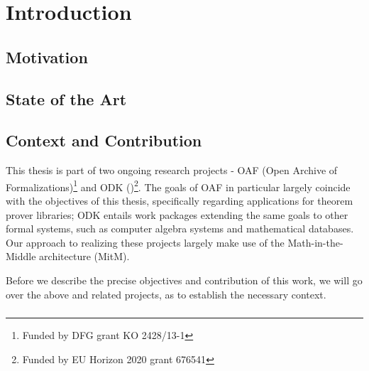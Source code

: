 \documentclass[a4paper,11pt]{book}
\begin{document}
\part{Introduction}

\chapter{Motivation}\label{ch:intro}


\chapter{State of the Art}\label{sec:intro:sota}


%

\chapter{Context and Contribution}\label{sec:intro:objectives}

This thesis is part of two ongoing research projects - OAF (Open Archive of Formalizations)\footnote{Funded by DFG grant KO 2428/13-1} and ODK (\ODK)\footnote{Funded by EU Horizon 2020 grant 676541}. The goals of OAF in particular largely coincide with the objectives of this thesis, specifically regarding applications for theorem prover libraries; ODK entails work packages extending the same goals to other formal systems, such as computer algebra systems and mathematical databases. Our approach to realizing these projects largely make use of the Math-in-the-Middle architecture (MitM).

Before we describe the precise objectives and contribution of this work, we will go over the above and related projects, as to establish the necessary context.


\section{\latin}\label{sec:intro:prelim:latin}



\section{\ODK}\label{sec:intro:prelim:odk}


\end{document}
